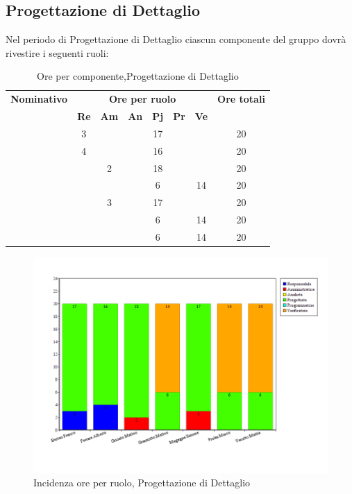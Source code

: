 \subsection{Progettazione di Dettaglio}
Nel periodo di Progettazione di Dettaglio ciascun componente del gruppo dovrà rivestire i seguenti ruoli:
\begin{table}[H]
	\begin{center}
		\begin{tabular}{|c|c|c|c|c|c|c|c|}
			\hline
			\textbf{Nominativo} & \multicolumn{6}{c|}{\textbf{Ore per ruolo}} & \textbf{Ore totali} \\
			& \textbf{Re} & \textbf{Am} & \textbf{An} & \textbf{Pj} & \textbf{Pr} & \textbf{Ve} & \\
			\hline
			\FB		&	3	&		&		&	17	&		&		&	20	\\ 
			\hline
			\AF		&	4	&		&		&	16	&		&		& 	20	\\ 
			\hline
			\GN		&		&	2	&		&	18	&		&		&	20	\\ 
			\hline									
			\GR	&		&	 	&		&	6	&	 	& 	14	&	20	\\
			\hline
			\SM 		&		&	3	&		&	17	&		& 		&	20	\\ 
			\hline
			\MP 		& 		&		&		&	6	&		&	14	&	20	\\ 
			\hline
			\MV 		&		&		&		&	6	&		&	14	& 	20	\\ 
			\hline
		\end{tabular}
	\end{center}
	\caption{Ore per componente,Progettazione di Dettaglio}
\end{table}

\begin{figure}[H]
	\centering
	\includegraphics[scale=0.4]{immagini/Grafi/GrafoPD}
	\caption{Incidenza ore per ruolo, Progettazione di Dettaglio}
\end{figure}

